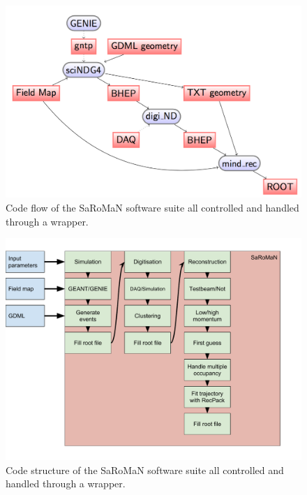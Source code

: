 \begin{figure}[h!]
\centering
\includegraphics[width=\textwidth]{figures/codeFlow.png}
\caption{Code flow of the SaRoMaN software suite all controlled and handled through a wrapper.}
\label{fig:codeFlow}
\end{figure}

\begin{figure}[h!]
\centering
\includegraphics[width=\textwidth]{figures/Software_structure.pdf}
\caption{Code structure of the SaRoMaN software suite all controlled and handled through a wrapper.}
\label{fig:structure}
\end{figure}


